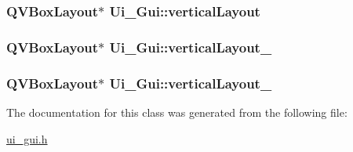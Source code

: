 \label{classUi__Gui_a392eecf3d4394e8429553c262c0efea0}
\hypertarget{classUi__Gui_af68993febd8983e57c8a2d590f82f6f4}{
\subsubsection[{verticalLayout}]{\setlength{\rightskip}{0pt plus 5cm}QVBoxLayout$\ast$ {\bf Ui\_\-Gui::verticalLayout}}}
\label{classUi__Gui_af68993febd8983e57c8a2d590f82f6f4}
\hypertarget{classUi__Gui_a7c6c89e18b906d464244b3978605b4ad}{
\subsubsection[{verticalLayout\_\-2}]{\setlength{\rightskip}{0pt plus 5cm}QVBoxLayout$\ast$ {\bf Ui\_\-Gui::verticalLayout\_}}}
\label{classUi__Gui_a7c6c89e18b906d464244b3978605b4ad}
\hypertarget{classUi__Gui_a4ed8e4d187e4e7ea02dd1a874ab3555b}{
\subsubsection[{verticalLayout\_\-3}]{\setlength{\rightskip}{0pt plus 5cm}QVBoxLayout$\ast$ {\bf Ui\_\-Gui::verticalLayout\_}}}
\label{classUi__Gui_a4ed8e4d187e4e7ea02dd1a874ab3555b}


The documentation for this class was generated from the following file:\begin{DoxyCompactItemize}
\item 
\hyperlink{ui__gui_8h}{ui\_\-gui.h}\end{DoxyCompactItemize}
